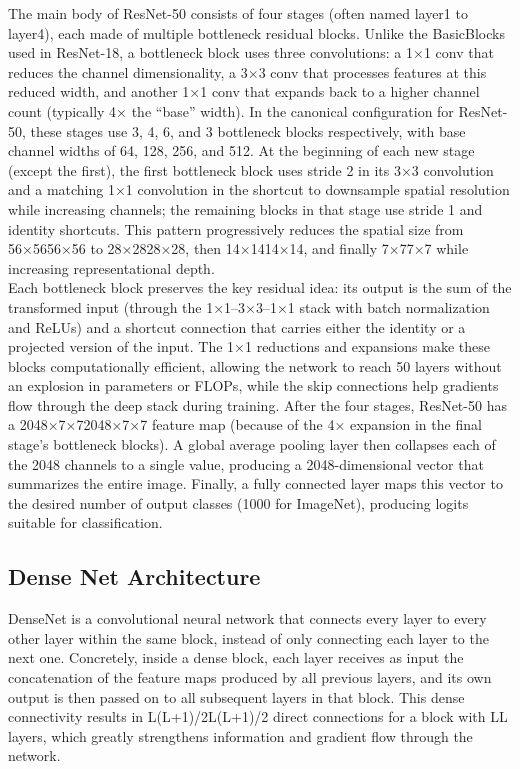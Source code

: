 The main body of ResNet-50 consists of four stages (often named layer1 to layer4), each made of multiple bottleneck residual blocks. Unlike the BasicBlocks used in ResNet-18, a bottleneck block uses three convolutions: a 1×1 conv that reduces the channel dimensionality, a 3×3 conv that processes features at this reduced width, and another 1×1 conv that expands back to a higher channel count (typically 4× the “base” width). In the canonical configuration for ResNet-50, these stages use 3, 4, 6, and 3 bottleneck blocks respectively, with base channel widths of 64, 128, 256, and 512. At the beginning of each new stage (except the first), the first bottleneck block uses stride 2 in its 3×3 convolution and a matching 1×1 convolution in the shortcut to downsample spatial resolution while increasing channels; the remaining blocks in that stage use stride 1 and identity shortcuts. This pattern progressively reduces the spatial size from 56×5656×56 to 28×2828×28, then 14×1414×14, and finally 7×77×7 while increasing representational depth.
\\
Each bottleneck block preserves the key residual idea: its output is the sum of the transformed input (through the 1×1–3×3–1×1 stack with batch normalization and ReLUs) and a shortcut connection that carries either the identity or a projected version of the input. The 1×1 reductions and expansions make these blocks computationally efficient, allowing the network to reach 50 layers without an explosion in parameters or FLOPs, while the skip connections help gradients flow through the deep stack during training. After the four stages, ResNet-50 has a 2048×7×72048×7×7 feature map (because of the 4× expansion in the final stage’s bottleneck blocks). A global average pooling layer then collapses each of the 2048 channels to a single value, producing a 2048-dimensional vector that summarizes the entire image. Finally, a fully connected layer maps this vector to the desired number of output classes (1000 for ImageNet), producing logits suitable for classification.

\subsection{Dense Net Architecture}
DenseNet is a convolutional neural network that connects every layer to every other layer within the same block, instead of only connecting each layer to the next one. Concretely, inside a dense block, each layer receives as input the concatenation of the feature maps produced by all previous layers, and its own output is then passed on to all subsequent layers in that block. This dense connectivity results in L(L+1)/2L(L+1)/2 direct connections for a block with LL layers, which greatly strengthens information and gradient flow through the network.
\\

